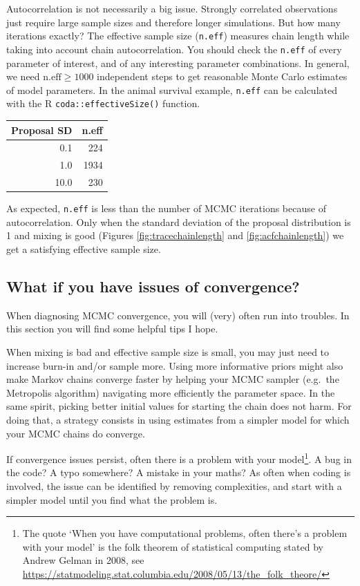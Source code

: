 \documentclass[
  12pt,
]{krantz}
\begin{document}
Autocorrelation is not necessarily a big issue. Strongly correlated observations just require large sample sizes and therefore longer simulations. But how many iterations exactly? The effective sample size (\texttt{n.eff}) measures chain length while taking into account chain autocorrelation. You should check the \texttt{n.eff} of every parameter of interest, and of any interesting parameter combinations. In general, we need \(\text{n.eff} \geq 1000\) independent steps to get reasonable Monte Carlo estimates of model parameters. In the animal survival example, \texttt{n.eff} can be calculated with the R \texttt{coda::effectiveSize()} function.

\begin{longtable}[]{@{}rr@{}}
\toprule
Proposal SD & n.eff \\
\midrule
\endhead
0.1 & 224 \\
1.0 & 1934 \\
10.0 & 230 \\
\bottomrule
\end{longtable}

As expected, \texttt{n.eff} is less than the number of MCMC iterations because of autocorrelation. Only when the standard deviation of the proposal distribution is 1 and mixing is good (Figures \ref{fig:tracechainlength} and \ref{fig:acfchainlength}) we get a satisfying effective sample size.

\hypertarget{what-if-you-have-issues-of-convergence}{%
\subsection{What if you have issues of convergence?}\label{what-if-you-have-issues-of-convergence}}

When diagnosing MCMC convergence, you will (very) often run into troubles. In this section you will find some helpful tips I hope.

When mixing is bad and effective sample size is small, you may just need to increase burn-in and/or sample more. Using more informative priors might also make Markov chains converge faster by helping your MCMC sampler (e.g.~the Metropolis algorithm) navigating more efficiently the parameter space. In the same spirit, picking better initial values for starting the chain does not harm. For doing that, a strategy consists in using estimates from a simpler model for which your MCMC chains do converge.

If convergence issues persist, often there is a problem with your model\footnote{The quote `When you have computational problems, often there's a problem with your model' is the folk theorem of statistical computing stated by Andrew Gelman in 2008, see \url{https://statmodeling.stat.columbia.edu/2008/05/13/the_folk_theore/}}. A bug in the code? A typo somewhere? A mistake in your maths? As often when coding is involved, the issue can be identified by removing complexities, and start with a simpler model until you find what the problem is.
\end{document}
